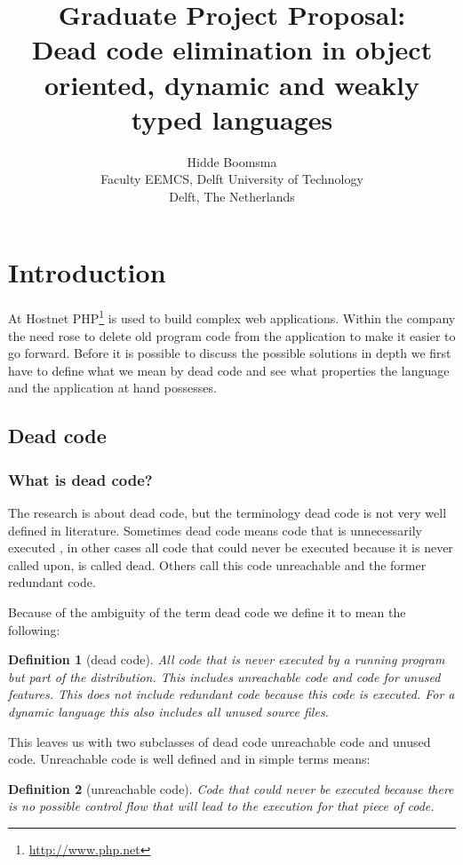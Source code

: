 \documentclass[a4paper,10pt,twocolumn]{article}
\title{Graduate Project Proposal: \\ Dead code elimination in object oriented, dynamic and weakly typed languages}
\author{Hidde Boomsma \\ Faculty EEMCS, Delft University of Technology \\ Delft, The Netherlands}
\newtheorem*{definition}{Definition}
\begin{document}
\maketitle

\section{Introduction}
At Hostnet PHP\footnote{\url{http://www.php.net}} is used to build complex web applications. Within the company the need rose to delete old program code from the application to make it easier to go forward. Before it is possible to discuss the possible solutions in depth we first have to define what we mean by dead code and see what properties the language and the application at hand possesses.  

\subsection{Dead code}

\subsubsection*{What is dead code?}
The research is about dead code, but the terminology dead code is not very well defined in literature. Sometimes dead code means code that is unnecessarily executed \cite{knoop1994}, in other cases all code that could never be executed because it is never called upon, is called dead\cite{chen1998}. Others call this code unreachable\cite{janota2007} and the former redundant code\cite{biggar2010}.

Because of the ambiguity of the term dead code we define it to mean the following:
\begin{definition}[dead code]
All code that is never executed by a running program but part of the distribution. This includes unreachable code and code for unused features. This does not include redundant code because this code is executed. For a dynamic language this also includes all unused source files.
\end{definition}


This leaves us with two subclasses of dead code unreachable code and unused code. Unreachable co\-de is well defined and in simple terms means:

\begin{definition}[unreachable code]
Code that could never be executed because there is no possible control flow that will lead to the execution for that piece of code.
\end{definition}
\end{document}
